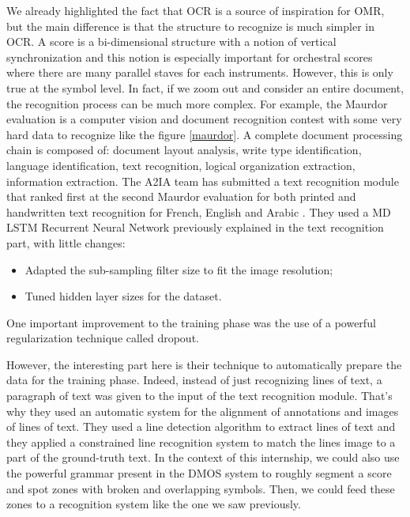\documentclass[11pt]{sdm}
\begin{document}
We already highlighted the fact that OCR is a source of inspiration for OMR, but the main difference is that the structure to recognize is much simpler in OCR.
A score is a bi-dimensional structure with a notion of vertical synchronization and this notion is especially important for orchestral scores where there are many parallel staves for each instruments.
However, this is only true at the symbol level.
In fact, if we zoom out and consider an entire document, the recognition process can be much more complex.
For example, the Maurdor evaluation \cite{_maurdor_????} is a computer vision and document recognition contest with some very hard data to recognize like the figure \ref{maurdor}.
A complete document processing chain is composed of: document layout analysis, write type identification, language identification, text recognition, logical organization extraction, information extraction.
The A2IA team has submitted a text recognition module that ranked first at the second Maurdor evaluation for both printed and handwritten text recognition for French, English and Arabic \cite{moysset_a2ia_2014}.
They used a MD LSTM Recurrent Neural Network previously explained in the text recognition part, with little changes:
\begin{itemize}
  \item Adapted the sub-sampling filter size to fit the image resolution;
  \item Tuned hidden layer sizes for the dataset.
\end{itemize}
One important improvement to the training phase was the use of a powerful regularization technique called dropout.

However, the interesting part here is their technique to automatically prepare the data for the training phase.
Indeed, instead of just recognizing lines of text, a paragraph of text was given to the input of the text recognition module.
That's why they used an automatic system for the alignment of annotations and images of lines of text.
They used a line detection algorithm to extract lines of text and they applied a constrained line recognition system to match the lines image to a part of the ground-truth text.
In the context of this internship, we could also use the powerful grammar present in the DMOS system to roughly segment a score and spot zones with broken and overlapping symbols.
Then, we could feed these zones to a recognition system like the one we saw previously.
\end{document}
